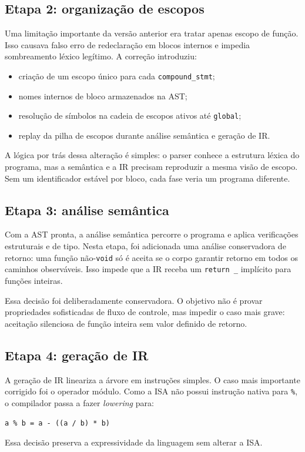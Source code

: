 \documentclass[12pt,a4paper]{article}
\begin{document}
\subsection{Etapa 2: organização de escopos}
Uma limitação importante da versão anterior era tratar apenas escopo de função. Isso causava falso erro de redeclaração em blocos internos e impedia sombreamento léxico legítimo. A correção introduziu:
\begin{itemize}[leftmargin=1.5em]
    \item criação de um escopo único para cada \texttt{compound\_stmt};
    \item nomes internos de bloco armazenados na AST;
    \item resolução de símbolos na cadeia de escopos ativos até \texttt{global};
    \item replay da pilha de escopos durante análise semântica e geração de IR.
\end{itemize}

A lógica por trás dessa alteração é simples: o parser conhece a estrutura léxica do programa, mas a semântica e a IR precisam reproduzir a mesma visão de escopo. Sem um identificador estável por bloco, cada fase veria um programa diferente.

\subsection{Etapa 3: análise semântica}
Com a AST pronta, a análise semântica percorre o programa e aplica verificações estruturais e de tipo. Nesta etapa, foi adicionada uma análise conservadora de retorno: uma função não-\texttt{void} só é aceita se o corpo garantir retorno em todos os caminhos observáveis. Isso impede que a IR receba um \texttt{return \_} implícito para funções inteiras.

Essa decisão foi deliberadamente conservadora. O objetivo não é provar propriedades sofisticadas de fluxo de controle, mas impedir o caso mais grave: aceitação silenciosa de função inteira sem valor definido de retorno.

\subsection{Etapa 4: geração de IR}
A geração de IR lineariza a árvore em instruções simples. O caso mais importante corrigido foi o operador módulo. Como a ISA não possui instrução nativa para \texttt{\%}, o compilador passa a fazer \emph{lowering} para:
\begin{center}
\texttt{a \% b = a - ((a / b) * b)}
\end{center}
Essa decisão preserva a expressividade da linguagem sem alterar a ISA.
\end{document}
